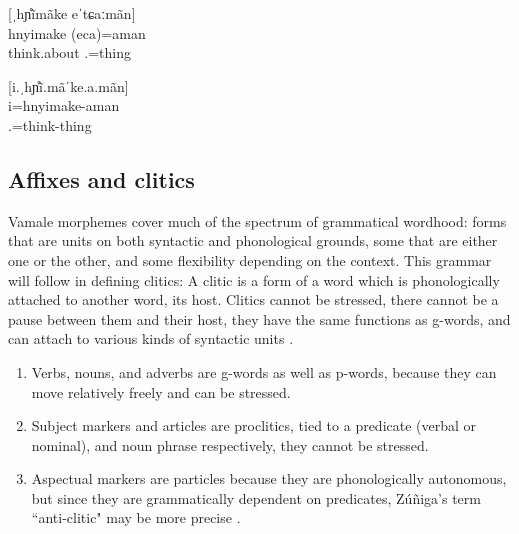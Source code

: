 \ea\label{ex:rea1}
[ˌhɲ̊ĩmãke eˈtɕaːmãn]\\
\gll hnyimake (eca)=aman\\
 think.about .=thing\\
\glt {}
\z


\ea\label{ex:rea2}
[i.ˌhɲ̊ĩ.mãˈke.a.mãn]\\
\gll i=hnyimake-aman\\
 .=think-thing\\
\glt {}
\z	
	

\subsection{Affixes and clitics}
\begin{sloppypar}
Vamale morphemes cover much of the spectrum of grammatical wordhood: forms that are units on both syntactic and phonological grounds, some that are either one or the other, and some flexibility depending on the context.  
This grammar will follow \textcite{spencer_clitics_2012} in defining clitics: A clitic is a form of a word which is phonologically attached to another word, its host. Clitics cannot be stressed, there cannot be a pause between them and their host, they have the same functions as g-words, and can attach to various kinds of syntactic units \parencite[1]{spencer_clitics_2012}.
\end{sloppypar}

\begin{enumerate}
	\item Verbs, nouns, and adverbs are g-words as well as p-words, because they can move relatively freely and can be stressed.
	\item Subject markers and articles are proclitics, tied to a predicate (verbal or nominal), and noun phrase respectively, they cannot be stressed.
	\item Aspectual markers are particles because they are phonologically autonomous, but since they are grammatically dependent on predicates, Zúñiga's term ``anti-clitic" may be more precise \parencite{zuniga_anti_2014}.

\end{enumerate}

